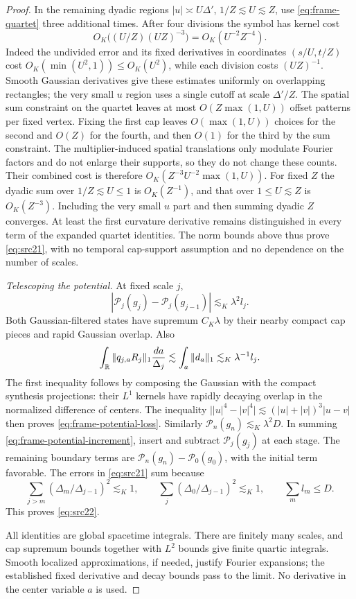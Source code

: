 \begin{proof}
In the remaining dyadic regions $|u|\asymp U\Delta'$,
$1/Z\lesssim U\lesssim Z$, use \eqref{eq:frame-quartet} three
additional times.  After four divisions the symbol has kernel cost
\[
 O_K\bigl((U/Z)(UZ)^{-3}\bigr)
       =O_K(U^{-2}Z^{-4}).
\]
Indeed the undivided error and its fixed derivatives in coordinates
$(s/U,t/Z)$ cost $O_K(\min(U^2,1))\leq O_K(U^2)$, while each
division costs $(UZ)^{-1}$.
Smooth Gaussian derivatives give these estimates uniformly on
overlapping rectangles; the very small $u$ region uses a single
cutoff at scale $\Delta'/Z$.
The spatial sum constraint on the quartet leaves at most
$O(Z\max(1,U))$ offset patterns per fixed vertex.
Fixing the first cap leaves $O(\max(1,U))$ choices for the second
and $O(Z)$ for the fourth, and then $O(1)$ for the third by the sum
constraint.  The multiplier-induced spatial translations only
modulate Fourier factors and do not enlarge their supports, so they
do not change these counts.
Their combined cost is therefore
$O_K(Z^{-3}U^{-2}\max(1,U))$.
For fixed $Z$ the dyadic sum over $1/Z\lesssim U\leq1$ is
$O_K(Z^{-1})$, and that over $1\leq U\lesssim Z$ is
$O_K(Z^{-3})$.  Including the very small $u$ part and then summing
dyadic $Z$ converges.  At least the first curvature derivative remains
distinguished in every term of the expanded quartet identities.
The norm bounds above thus prove \eqref{eq:src21}, with no temporal
cap-support assumption and no dependence on the number of scales.

\emph{Telescoping the potential.}
At fixed scale $j$,
\begin{equation}\label{eq:frame-potential-loss}
 |\mathcal P_j(g_j)-\mathcal P_j(g_{j-1})|
 \lesssim_K\lambda^2l_j.
\end{equation}
Both Gaussian-filtered states have supremum $C_K\lambda$ by their
nearby compact cap pieces and rapid Gaussian overlap.  Also
\[
 \int_\mathbb R\|q_{j,a}R_j\|_1\frac{da}{\Delta_j}
 \lesssim\int_a\|d_a\|_1\lesssim_K\lambda^{-1}l_j.
\]
The first inequality follows by composing the Gaussian with the
compact synthesis projections: their $L^1$ kernels have rapidly
decaying overlap in the normalized difference of centers.
The inequality
$\bigl||u|^4-|v|^4\bigr|\lesssim(|u|+|v|)^3|u-v|$
then proves \eqref{eq:frame-potential-loss}.
Similarly $\mathcal P_n(g_n)\lesssim_K\lambda^2D$.
In summing \eqref{eq:frame-potential-increment}, insert and subtract
$\mathcal P_j(g_j)$ at each stage.  The remaining boundary terms are
$\mathcal P_n(g_n)-\mathcal P_0(g_0)$, with the initial term favorable.
The errors in \eqref{eq:src21} sum because
\[
 \sum_{j>m}(\Delta_m/\Delta_{j-1})^2\lesssim_K1,
 \qquad
 \sum_j(\Delta_0/\Delta_{j-1})^2\lesssim_K1,
 \qquad \sum_ml_m\leq D.
\]
This proves \eqref{eq:src22}.

All identities are global spacetime integrals.  There are finitely
many scales, and cap supremum bounds together with $L^2$ bounds give
finite quartic integrals.  Smooth localized approximations, if needed,
justify Fourier expansions; the established fixed derivative and
decay bounds pass to the limit.  No derivative in the center variable
$a$ is used.
\end{proof}

